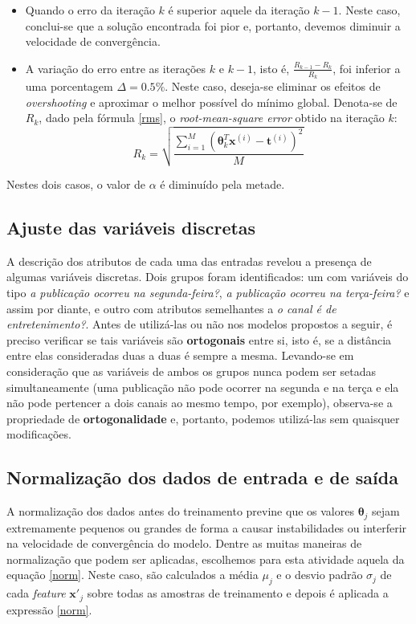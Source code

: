 \documentclass[10pt,twocolumn,letterpaper]{article}
\begin{document}
\begin{itemize}
	\item Quando o erro da iteração \(k\) é superior aquele da iteração \(k -1\). Neste caso, conclui-se que a solução encontrada foi pior e, portanto, devemos diminuir a velocidade de convergência.
	\item A variação do erro entre as iterações \(k\) e \(k -1\), isto é, \(\frac{R_{k - 1} - R_k}{R_k}\), foi inferior a uma porcentagem \(\Delta = 0.5\%\). Neste caso, deseja-se eliminar os efeitos de \textit{overshooting} e aproximar o melhor possível do mínimo global. Denota-se de \(R_k\), dado pela fórmula \ref {rms}, o \textit{root-mean-square error} obtido na iteração \(k\):
	\begin {equation}
	\label{rms}
	R_k = \sqrt{\frac {\sum_{i=1}^{M} \left(\bm{\theta}_k^T\bm{x}^{(i)} - \bm{t}^{(i)}\right)^2}{M}}
	\end{equation}
\end{itemize}

Nestes dois casos, o valor de \(\alpha\) é diminuído pela metade.

\subsection {Ajuste das variáveis discretas}

A descrição dos atributos de cada uma das entradas revelou a presença de algumas variáveis discretas. Dois grupos foram identificados: um com variáveis do tipo \textit{a publicação ocorreu na segunda-feira?}, \textit{a publicação ocorreu na terça-feira?} e assim por diante, e outro com atributos semelhantes a \textit{o canal é de entretenimento?}. Antes de utilizá-las ou não nos modelos propostos a seguir, é preciso verificar se tais variáveis são \textbf {ortogonais} entre si, isto é, se a distância entre elas consideradas duas a duas é sempre a mesma. Levando-se em consideração que as variáveis de ambos os grupos nunca podem ser setadas simultaneamente (uma publicação não pode ocorrer na segunda e na terça e ela não pode pertencer a dois canais ao mesmo tempo, por exemplo), observa-se a propriedade de \textbf {ortogonalidade} e, portanto, podemos utilizá-las sem quaisquer modificações.

\subsection {Normalização dos dados de entrada e de saída}

A normalização dos dados antes do treinamento previne que os valores \(\bm{\theta}_j\) sejam extremamente pequenos ou grandes de forma a
causar instabilidades ou interferir na velocidade de convergência do modelo. Dentre as muitas maneiras de normalização que podem ser aplicadas, escolhemos para esta atividade aquela da equação \ref{norm}. Neste caso, são calculados a média \(\mu_j\) e o desvio padrão \(\sigma_j\) de cada \textit{feature} \(\bm {x'}_j\) sobre todas as amostras de treinamento e depois é aplicada a expressão \ref{norm}.
\end{document}
